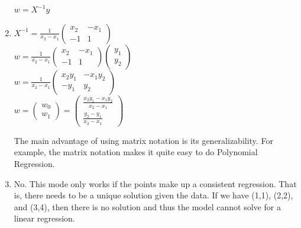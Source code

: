 \documentclass{harvardml}
\theoremstyle{definition}
\theoremstyle{plain}
\begin{document}
\begin{solution}
\begin{enumerate}
    $w = X^{-1}y$
    \item $X^{-1} = \frac{1}{x_2-x_1}\begin{pmatrix} x_2 & -x_1 \\ -1 & 1\end{pmatrix}$\\
    $w = \frac{1}{x_2-x_1}\begin{pmatrix} x_2 & -x_1 \\ -1 & 1\end{pmatrix} \begin{pmatrix} y_1 \\ y_2\end{pmatrix}$\\
    $w = \frac{1}{x_2-x_1}\begin{pmatrix} x_2y_1 & -x_1y_2 \\ -y_1 & y_2\end{pmatrix}$\\
    $w = \begin{pmatrix} w_0 \\ w_1\end{pmatrix} = \begin{pmatrix} \frac{x_2y_1-x_1y_2}{x_2-x_1} \\ \frac{y_2-y_1}{x_2-x_1}\end{pmatrix}$

    The main advantage of using matrix notation is its generalizability. For example,
    the matrix notation makes it quite easy to do Polynomial Regression.
    \item No. This mode only works if the points make up a consistent regression.
    That is, there needs to be a unique solution given the data. If we have (1,1), (2,2), and (3,4),
    then there is no solution and thus the model cannot solve for a linear regression.


\end{enumerate}
\end{solution}
\end{document}
